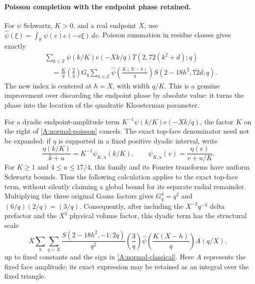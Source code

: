 \paragraph{Poisson completion with the endpoint phase retained.}
For $\psi$ Schwartz, $K>0$, and a real endpoint $X$, use
$\widehat\psi(\xi)=\int_{\mathbb R}\psi(v)e(-v\xi)\,dv$.
Poisson summation in residue classes gives exactly
\begin{align}
 &\sum_{k\in\mathbb Z}\psi(k/K)e(-Xk/q)
              T(2,\overline{72}(k^2+d);q)\nonumber\\
 &\quad=\frac Kq\left(\frac2q\right)G_q
     \sum_{h\in\mathbb Z}
       \widehat\psi\!\left(\frac{K(X-h)}q\right)
       S(2-18h^2,\overline{72}d;q).
 \label{A:normal-poisson}
\end{align}
The new index is centered at $h=X$, with width $q/K$.
This is a genuine improvement over discarding the endpoint
phase by absolute value: it turns the phase into the location
of the quadratic Kloosterman parameter.

For a dyadic endpoint-amplitude term
$K^{-1}\psi(k/K)e(-Xk/q)$, the factor $K$ on the right
of \eqref{A:normal-poisson} cancels.
The exact top-face denominator need not be expanded:
if $\eta$ is supported in a fixed positive dyadic interval, write
\[
 \frac{\eta(k/K)}{k+u}
   =K^{-1}\psi_{K,u}(k/K),\qquad
 \psi_{K,u}(v)=\frac{\eta(v)}{v+u/K}.
\]
For $K\geq1$ and $4\leq u\leq17/4$, this family and its Fourier
transforms have uniform Schwartz bounds. Thus the following
calculation applies to the exact top-face term, without silently
claiming a global bound for its separate radial remainder.
Multiplying the three original Gauss factors gives
$G_q^4=q^2$ and
$(6/q)(2/q)=(3/q)$. Consequently, after including the
$X^{-2}q^{-3}$ delta prefactor and the $X^3$ physical
volume factor, this dyadic term has the structural scale
\begin{equation}\label{A:normal-completed-scale}
 X\sum_h\sum_{q\asymp X}
    \frac{S(2-18h^2,-1;2q)}{q^2}
    \left(\frac3q\right)
    \widehat\psi\!\left(\frac{K(X-h)}q\right)
    A(q/X),
\end{equation}
up to fixed constants and the sign in
\eqref{A:normal-classical}. Here $A$ represents the fixed
face amplitude; its exact expression may be retained as
an integral over the fixed triangle.

